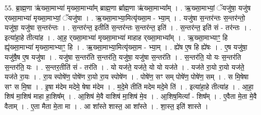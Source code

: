 \documentclass[17pt]{extarticle}
\begin{document}
55. ब्रा॒ह्म॒णा ऋ॑ख्सा॒माभ्या॑ मृख्सा॒माभ्या᳚म् ब्राह्म॒णा ब्रा᳚ह्म॒णा ऋ॑ख्सा॒माभ्या᳚म् । . ऋ॒ख्सा॒माभ्यां॒ ॅयजु॑षा॒ यजु॑ष र्‌ख्सा॒माभ्या॑ मृख्सा॒माभ्यां॒ ॅयजु॑षा । . ऋ॒ख्सा॒माभ्या॒मित्यृ॑ख्सा॒म - भ्या॒म् । . यजु॑षा स॒न्तर॑न्तः स॒न्तर॑न्तो॒ यजु॑षा॒ यजु॑षा स॒न्तर॑न्तः । . स॒न्तर॑न्त॒ इतीति॑ स॒न्तर॑न्तः स॒न्तर॑न्त॒ इति॑ । . स॒न्तर॑न्त॒ इति॑ सं - तर॑न्तः । . इत्या॑हा॒हे तीत्या॑ह । . आ॒ह॒ र्‌ख्सा॒माभ्या॑ मृख्सा॒माभ्या॑ माहाह र्‌ख्सा॒माभ्या᳚म् । . ऋ॒ख्सा॒माभ्याꣳ॒॒ हि ह्यृ॑ख्सा॒माभ्या॑ मृख्सा॒माभ्याꣳ॒॒ हि । . ऋ॒ख्सा॒माभ्या॒मित्यृ॑ख्सा॒म - भ्या॒म् । . ह्ये॑ष ए॒ष हि ह्ये॑षः । . ए॒ष यजु॑षा॒ यजु॑षै॒ष ए॒ष यजु॑षा । . यजु॑षा स॒न्तर॑ति स॒न्तर॑ति॒ यजु॑षा॒ यजु॑षा स॒न्तर॑ति । . स॒न्तर॑ति॒ यो यः स॒न्तर॑ति स॒न्तर॑ति॒ यः । . स॒न्तर॒तीति॑ सं - तर॑ति । . यो यज॑ते॒ यज॑ते॒ यो यो यज॑ते । . यज॑ते रा॒यो रा॒यो यज॑ते॒ यज॑ते रा॒यः । . रा॒य स्पोषे॑ण॒ पोषे॑ण रा॒यो रा॒य स्पोषे॑ण । . पोषे॑ण॒ सꣳ सम् पोषे॑ण॒ पोषे॑ण॒ सम् । . स मि॒षेषा सꣳ स मि॒षा । . इ॒षा म॑देम मदेमे॒ षेषा म॑देम । . म॒दे॒मे तीति॑ मदेम मदे॒मे ति॑ । . इत्या॑हा॒हे तीत्या॑ह । . आ॒हा॒ शिष॑ मा॒शिष॑ माहा हा॒शिष᳚म् । . आ॒शिष॑ मे॒वै वाशिष॑ मा॒शिष॑ मे॒व । . आ॒शिष॒मित्या᳚ - शिष᳚म् । . ए॒वैता मे॒ता मे॒वै वैताम् । . ए॒ता मैता मे॒ता मा । . आ शा᳚स्ते शास्त॒ आ शा᳚स्ते । . शा॒स्त॒ इति॑ शास्ते । \newline
\pagebreak
{}
\end{document}
